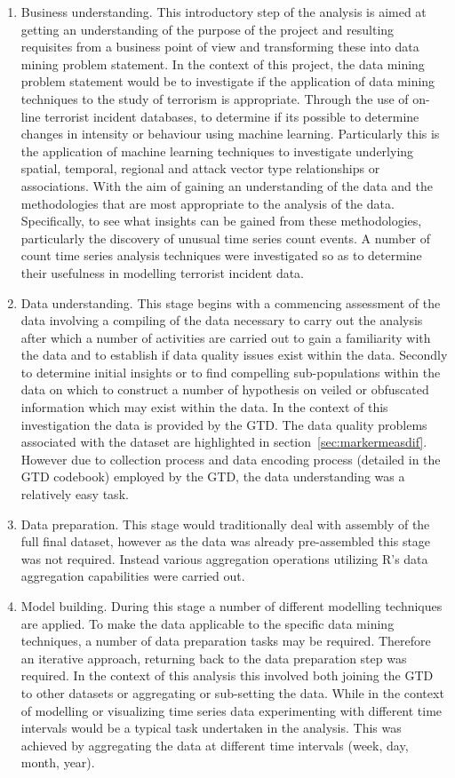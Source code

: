 \begin{enumerate}
\item Business understanding. This introductory step of the analysis is aimed at getting an understanding of the purpose of the project and resulting requisites from a business point of view and transforming these into data mining problem statement. 
In the context of this project, the data mining problem statement would be to investigate if the application of data mining techniques to the study of terrorism is appropriate. Through the use of on-line terrorist incident  databases, to determine if its possible to determine changes in intensity or behaviour using machine learning. Particularly this is the application of machine learning techniques to investigate underlying spatial, temporal, regional and attack vector type relationships or associations. With the aim of gaining an understanding of the data and the methodologies that are most appropriate to the analysis of the data. Specifically, to see what insights can be gained from these methodologies, particularly the discovery of unusual time series count events. A number of count time series analysis techniques were investigated so as to determine their usefulness in modelling terrorist incident data. 
\item Data understanding. This stage begins with a commencing assessment of the data involving a compiling of the data necessary to carry out the analysis after which a number of activities are carried out to gain a familiarity with the data and to establish if data quality issues exist within the data. Secondly to determine initial insights or to find compelling sub-populations within the data on which to construct a number of hypothesis on veiled or obfuscated information which may exist within the data. In the context of this investigation the data is provided by the GTD. The data quality problems associated with the dataset are highlighted in section~\ref{sec:markermeasdif}. However due to collection process and data encoding process (detailed in the GTD codebook) employed by the GTD, the data understanding was a relatively easy task.
\item Data preparation. This stage would traditionally deal with assembly of the full final dataset, however as the data was already pre-assembled this stage was not required. Instead various aggregation operations utilizing R's data aggregation capabilities were carried out.  
\item Model building. During this stage a number of different modelling techniques are applied. To make the data applicable to the specific data mining techniques, a number of data preparation tasks may be required. Therefore an iterative approach, returning back to the data preparation step was required. In the context of this analysis this involved both joining the GTD to other datasets or aggregating or sub-setting the data. While in the context of modelling or visualizing time series data experimenting with different time intervals would be a typical task undertaken in the analysis. This was achieved by aggregating the data at different time intervals (week, day, month, year).

\end{enumerate}
